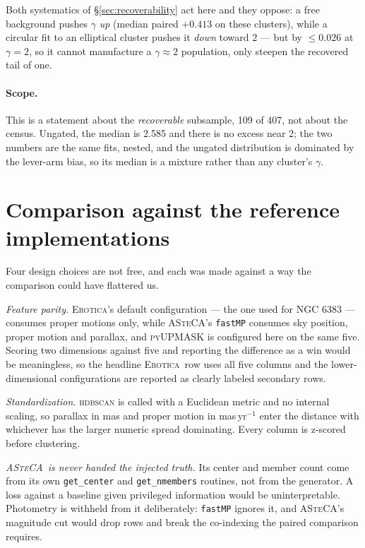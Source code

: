 \documentclass{aa}
\newcommand{\erotica}{\textsc{Erotica}}
\newcommand{\asteca}{\textsc{ASteCA}}
\begin{document}
Both systematics of \S\ref{sec:recoverability} act here and they oppose: a free background pushes
$\gamma$ \emph{up} (median paired $+0.413$ on these clusters), while a circular fit to an
elliptical cluster pushes it \emph{down} toward 2 --- but by $\leq0.026$ at $\gamma=2$, so it
cannot manufacture a $\gamma\approx2$ population, only steepen the recovered tail of one.

\paragraph{Scope.} This is a statement about the \emph{recoverable} subsample, 109 of 407, not
about the census. Ungated, the median is 2.585 and there is no excess near 2; the two numbers are
the same fits, nested, and the ungated distribution is dominated by the lever-arm bias, so its
median is a mixture rather than any cluster's $\gamma$.

\section{Comparison against the reference implementations}
\label{sec:benchmark}

Four design choices are not free, and each was made against a way the comparison could have
flattered us.

\emph{Feature parity.} \erotica's default configuration --- the one used for NGC 6383 --- consumes
proper motions only, while \asteca's \texttt{fastMP} consumes sky position, proper motion and
parallax, and \textsc{pyUPMASK} is configured here on the same five. Scoring two dimensions
against five and reporting the difference as a win would be meaningless, so the headline
\erotica\ row uses all five columns and the lower-dimensional configurations are reported as
clearly labeled secondary rows.

\emph{Standardization.} \textsc{hdbscan} is called with a Euclidean metric and no internal
scaling, so parallax in mas and proper motion in mas\,yr$^{-1}$ enter the distance with whichever
has the larger numeric spread dominating. Every column is z-scored before clustering.

\emph{\asteca\ is never handed the injected truth.} Its center and member count come from its own
\texttt{get\_center} and \texttt{get\_nmembers} routines, not from the generator. A loss against a
baseline given privileged information would be uninterpretable. Photometry is withheld from it
deliberately: \texttt{fastMP} ignores it, and \asteca's magnitude cut would drop rows and break
the co-indexing the paired comparison requires.
\end{document}
